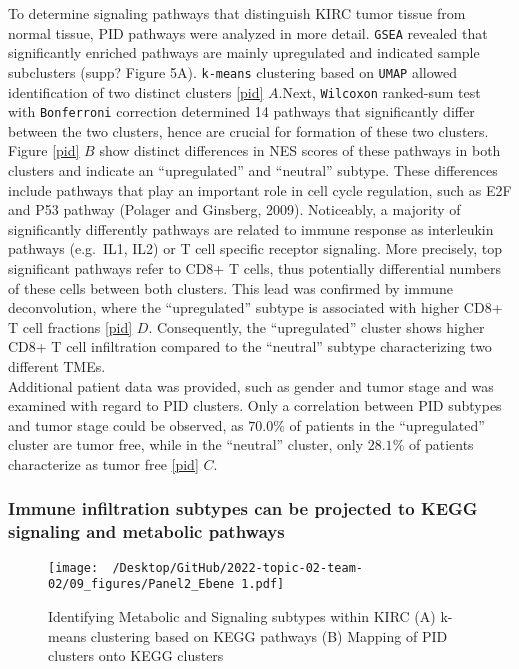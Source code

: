 \documentclass[
  parskip,
  oneside]{scrreprt}
\begin{document}
To determine signaling pathways that distinguish KIRC tumor tissue from
normal tissue, PID pathways were analyzed in more detail. \texttt{GSEA}
revealed that significantly enriched pathways are mainly upregulated and
indicated sample subclusters (supp? Figure 5A). \texttt{k-means}
clustering based on \texttt{UMAP} allowed identification of two distinct
clusters \cref{pid} \(A\).Next, \texttt{Wilcoxon} ranked-sum test with
\texttt{Bonferroni} correction determined 14 pathways that significantly
differ between the two clusters, hence are crucial for formation of
these two clusters. Figure \cref{pid} \(B\) show distinct differences in
NES scores of these pathways in both clusters and indicate an
``upregulated'' and ``neutral'' subtype. These differences include
pathways that play an important role in cell cycle regulation, such as
E2F and P53 pathway (Polager and Ginsberg, 2009). Noticeably, a majority
of significantly differently pathways are related to immune response as
interleukin pathways (e.g.~IL1, IL2) or T cell specific receptor
signaling. More precisely, top significant pathways refer to CD8+ T
cells, thus potentially differential numbers of these cells between both
clusters. This lead was confirmed by immune deconvolution, where the
``upregulated'' subtype is associated with higher CD8+ T cell fractions
\cref{pid} \(D\). Consequently, the ``upregulated'' cluster shows higher
CD8+ T cell infiltration compared to the ``neutral'' subtype
characterizing two different TMEs.\\
Additional patient data was provided, such as gender and tumor stage and
was examined with regard to PID clusters. Only a correlation between PID
subtypes and tumor stage could be observed, as \(70.0\%\) of patients in
the ``upregulated'' cluster are tumor free, while in the ``neutral''
cluster, only \(28.1\%\) of patients characterize as tumor free
\cref{pid} \(C\).

\hypertarget{immune-infiltration-subtypes-can-be-projected-to-kegg-signaling-and-metabolic-pathways}{%
\subsubsection{Immune infiltration subtypes can be projected to KEGG
signaling and metabolic
pathways}\label{immune-infiltration-subtypes-can-be-projected-to-kegg-signaling-and-metabolic-pathways}}

\begin{figure}[h]
  \texttt{[image: ~/Desktop/GitHub/2022-topic-02-team-02/09\_figures/Panel2\_Ebene 1.pdf]}
  \caption{Identifying Metabolic and Signaling subtypes within KIRC (A) k-means clustering based on KEGG pathways (B) Mapping of PID clusters onto KEGG clusters}
  \label{kegg}
\end{figure}
\end{document}
